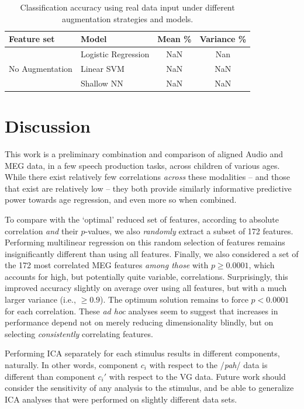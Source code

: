 \documentclass[utf8]{frontiersSCNS} %
\begin{document}
\begin{table}[t]
  \centering
  \label{tab:end2end_results}
  \begin{tabular}{l l | c | c}
    \textbf{Feature set} & Model & \textbf{Mean \%} & \textbf{Variance \%} \\
    \toprule
    \multirow{3}{*}{No Augmentation}
    & Logistic Regression & NaN & Nan  \\
    & Linear SVM          & NaN & NaN  \\
    & Shallow NN          & NaN & NaN  \\
    \midrule

    \bottomrule
  \end{tabular}
  \caption{Classification accuracy using real data input under different augmentation strategies and models.}
\end{table}

\section{Discussion}


This work is a preliminary combination and comparison of aligned Audio and MEG data, in a few speech production tasks, across children of various ages. While there exist relatively few correlations {\em across} these modalities -- and those that exist are relatively low -- they both provide similarly informative predictive power towards age regression, and even more so when combined.

To compare with the `optimal' reduced set of features, according to absolute correlation {\em and} their $p$-values, we also {\em randomly} extract a subset of 172 features. Performing multilinear regression on this random selection of features remains insignificantly different than using all features. Finally, we also considered a set of the 172 most correlated MEG features {\em among those} with $p \geq 0.0001$, which accounts for high, but potentially quite variable, correlations. Surprisingly, this improved accuracy slightly on average over using all features, but with a much larger variance (i.e., $\geq 0.9$). The optimum solution remains to force $p<0.0001$ for each correlation. These {\em ad hoc} analyses seem to suggest that increases in performance depend not on merely reducing dimensionality blindly, but on selecting {\em consistently} correlating features.

Performing ICA separately for each stimulus results in different components, naturally. In other words, component $c_i$ with respect to the /{\em pah}/ data is different than component $c_i'$ with respect to the VG data. Future work should consider the sensitivity of any analysis to the stimulus, and be able to generalize ICA analyses that were performed on slightly different data sets.
\end{document}
